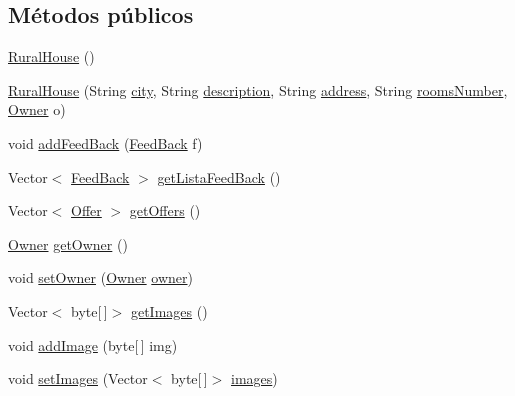 \subsection*{Métodos públicos}
\begin{DoxyCompactItemize}
\item 
\mbox{\hyperlink{classdomain_1_1_rural_house_a5e1f42ad6b3992bfc5fdece628455552}{Rural\+House}} ()
\item 
\mbox{\hyperlink{classdomain_1_1_rural_house_a696dcb2f31c1ad66b01f189bb17763df}{Rural\+House}} (String \mbox{\hyperlink{classdomain_1_1_rural_house_a4ac1bd1de58f97487abbcb8dc27a8077}{city}}, String \mbox{\hyperlink{classdomain_1_1_rural_house_afdc9d7b70bcc6baa94cae033a5684f0e}{description}}, String \mbox{\hyperlink{classdomain_1_1_rural_house_a6ba346c74cb3404ca6d04a2ebae730d3}{address}}, String \mbox{\hyperlink{classdomain_1_1_rural_house_a1cda0eff05ad06090ac37a259fdad562}{rooms\+Number}}, \mbox{\hyperlink{classdomain_1_1_owner}{Owner}} o)
\item 
void \mbox{\hyperlink{classdomain_1_1_rural_house_a4660dbd4e788ded7496bc96e4e29a47b}{add\+Feed\+Back}} (\mbox{\hyperlink{classdomain_1_1_feed_back}{Feed\+Back}} f)
\item 
Vector$<$ \mbox{\hyperlink{classdomain_1_1_feed_back}{Feed\+Back}} $>$ \mbox{\hyperlink{classdomain_1_1_rural_house_a2d672423144d413d9f4b94b9676af0b1}{get\+Lista\+Feed\+Back}} ()
\item 
Vector$<$ \mbox{\hyperlink{classdomain_1_1_offer}{Offer}} $>$ \mbox{\hyperlink{classdomain_1_1_rural_house_ae653409c7556fa8b3ccabd0c17604666}{get\+Offers}} ()
\item 
\mbox{\hyperlink{classdomain_1_1_owner}{Owner}} \mbox{\hyperlink{classdomain_1_1_rural_house_a1e5ccf38c0d875763f2e9120e36e412b}{get\+Owner}} ()
\item 
void \mbox{\hyperlink{classdomain_1_1_rural_house_a58145b223941d498d3d7eaa8b2696115}{set\+Owner}} (\mbox{\hyperlink{classdomain_1_1_owner}{Owner}} \mbox{\hyperlink{classdomain_1_1_rural_house_ab7cf574fe34e0feacd2f748682163281}{owner}})
\item 
Vector$<$ byte\mbox{[}$\,$\mbox{]}$>$ \mbox{\hyperlink{classdomain_1_1_rural_house_aa1acd38c652785b83bd4601d7ea5c761}{get\+Images}} ()
\item 
void \mbox{\hyperlink{classdomain_1_1_rural_house_a0d4787f58507c40f9474f2bec0a1250a}{add\+Image}} (byte\mbox{[}$\,$\mbox{]} img)
\item 
void \mbox{\hyperlink{classdomain_1_1_rural_house_aef9348ba3130b35de8e234672eec76cc}{set\+Images}} (Vector$<$ byte\mbox{[}$\,$\mbox{]}$>$ \mbox{\hyperlink{classdomain_1_1_rural_house_a6009294a82be0d6cbd824e49479be51a}{images}})

\end{DoxyCompactItemize}
